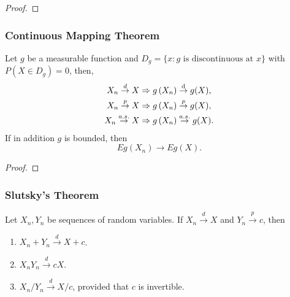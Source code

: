 \begin{proof}

\end{proof}

\subsubsection{Continuous Mapping Theorem}

\begin{theorem} \label{thm:continuous-mapping-theorem}
	Let $g$ be a measurable function and $D_g=\{x:g \text{ is discontinuous at } x\}$ with $P(X\in D_g)=0$, then,
	\begin{equation}
		\begin{aligned}
			X_{n} \stackrel{d}{\rightarrow} X    & \Rightarrow g\left(X_{n}\right) \stackrel{\mathop{}\!\mathrm{d}}{\rightarrow} g(X), \\
			X_{n} \stackrel{p}{\rightarrow} X    & \Rightarrow g\left(X_{n}\right) \stackrel{p}{\rightarrow} g(X),    \\
			X_{n} \stackrel{a.s.}{\rightarrow} X & \Rightarrow g\left(X_{n}\right) \stackrel{a.s.}{\rightarrow} g(X). \\
		\end{aligned}
	\end{equation}
	If in addition $g$ is bounded, then
	\begin{equation}
		Eg(X_n)\rightarrow Eg(X).
	\end{equation}
\end{theorem}

\begin{proof}

\end{proof}

\subsubsection{Slutsky's Theorem}

\begin{theorem} \label{thm:slutsky-theorem}
	Let $X_{n}, Y_{n}$ be sequences of random variables. If $X_{n}\stackrel{d}{\rightarrow}X$ and $Y_{n}\stackrel{p}{\rightarrow}c$, then
	\begin{enumerate}
		\item $X_{n}+Y_{n}\stackrel{d}{\rightarrow}X+c$.
		\item $X_{n}Y_{n}\stackrel{d}{\rightarrow}cX$.
		\item $X_{n}/Y_{n}\stackrel{d}{\rightarrow}X/c$, provided that $c$ is invertible.
	\end{enumerate}
\end{theorem}

